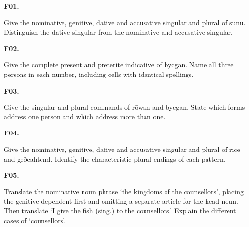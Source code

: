 \par\begin{minipage}{\linewidth}\raggedright
\textbf{F01.}

Give the nominative, genitive, dative and accusative singular and plural of sunu. Distinguish the dative singular from the nominative and accusative singular.

\end{minipage}\par\addvspace{4pt}

\par\begin{minipage}{\linewidth}\raggedright
\textbf{F02.}

Give the complete present and preterite indicative of bycgan. Name all three persons in each number, including cells with identical spellings.

\end{minipage}\par\addvspace{4pt}

\par\begin{minipage}{\linewidth}\raggedright
\textbf{F03.}

Give the singular and plural commands of rōwan and bycgan. State which forms address one person and which address more than one.

\end{minipage}\par\addvspace{4pt}

\par\begin{minipage}{\linewidth}\raggedright
\textbf{F04.}

Give the nominative, genitive, dative and accusative singular and plural of rīce and geðeahtend. Identify the characteristic plural endings of each pattern.

\end{minipage}\par\addvspace{4pt}

\par\begin{minipage}{\linewidth}\raggedright
\textbf{F05.}

Translate the nominative noun phrase ‘the kingdoms of the counsellors’, placing the genitive dependent first and omitting a separate article for the head noun. Then translate ‘I give the fish (sing.) to the counsellors.’ Explain the different cases of ‘counsellors’.

\end{minipage}\par\addvspace{4pt}


